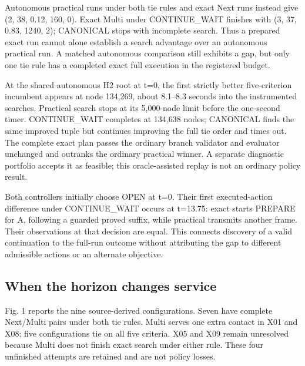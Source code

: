 \documentclass[12pt,a4paper]{article}
\begin{document}
Autonomous practical runs under both tie rules and exact Next runs instead give (2, 38, 0.12, 160, 0). Exact Multi under CONTINUE\_WAIT finishes with (3, 37, 0.83, 1240, 2); CANONICAL stops with incomplete search. Thus a prepared exact run cannot alone establish a search advantage over an autonomous practical run. A matched autonomous comparison still exhibits a gap, but only one tie rule has a completed exact full execution in the registered budget.

At the shared autonomous H2 root at t=0, the first strictly better five-criterion incumbent appears at node 134,269, about 8.1--8.3 seconds into the instrumented searches. Practical search stops at its 5,000-node limit before the one-second timer. CONTINUE\_WAIT completes at 134,638 nodes; CANONICAL finds the same improved tuple but continues improving the full tie order and times out. The complete exact plan passes the ordinary branch validator and evaluator unchanged and outranks the ordinary practical winner. A separate diagnostic portfolio accepts it as feasible; this oracle-assisted replay is not an ordinary policy result.

Both controllers initially choose OPEN at t=0. Their first executed-action difference under CONTINUE\_WAIT occurs at t=13.75: exact starts PREPARE for A, following a guarded proved suffix, while practical transmits another frame. Their observations at that decision are equal. This connects discovery of a valid continuation to the full-run outcome without attributing the gap to different admissible actions or an alternate objective.

\subsection*{When the horizon changes service}
Fig. 1 reports the nine source-derived configurations. Seven have complete Next/Multi pairs under both tie rules. Multi serves one extra contact in X01 and X08; five configurations tie on all five criteria. X05 and X09 remain unresolved because Multi does not finish exact search under either rule. These four unfinished attempts are retained and are not policy losses.
\end{document}
